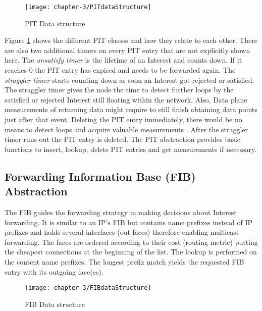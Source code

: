 \vspace{5mm} %

\begin{figure}[H]
  \centering
  \texttt{[image: chapter-3/PITdataStructure]}
  \caption{PIT Data structure \cite{Afanasyev16}}
  \label{fig:PITdataStructure}
\end{figure}

\vspace{5mm} %

Figure \ref{fig:PITdataStructure} shows the different PIT classes and how they relate to each other. There are also two additional timers on every PIT entry that are not explicitly shown here. The \emph{unsatisfy timer} is the lifetime of an Interest and counts down. If it reaches 0 the PIT entry has expired and needs to be forwarded again. The \emph{straggler timer} starts counting down as soon an Interest got rejected or satisfied. The straggler timer gives the node the time to detect further loops by the satisfied or rejected Interest still floating within the network. Also, Data plane measurements of returning data might require to still finish obtaining data points just after that event. Deleting the PIT entry immediately, there would be no means to detect loops and acquire valuable measurements \cite{Afanasyev16}. After the straggler timer runs out the PIT entry is deleted. The PIT abstraction provides basic functions to insert, lookup, delete PIT entries and get measurements if necessary.

\newpage

\subsection{Forwarding Information Base (FIB) Abstraction}

The FIB guides the forwarding strategy in making decisions about Interest forwarding. It is similar to an IP's FIB but contains name prefixes instead of IP prefixes and holds several interfaces (out-faces) therefore enabling multicast forwarding. The faces are ordered according to their cost (routing metric) putting the cheapest connections at the beginning of the list. The lookup is performed on the content name prefixes. The longest prefix match yields the requested FIB entry with its outgoing face(es).

\vspace{5mm} %

\begin{figure}[H]
  \centering
  \texttt{[image: chapter-3/FIBdataStructure]}
  \caption{FIB Data structure \cite{Afanasyev16}}
  \label{fig:FIBdataStructure}
\end{figure}

